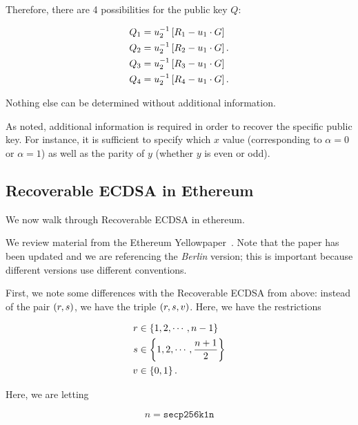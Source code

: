 \begin{itemize}
\noindent
Therefore, there are 4 possibilities for the public key $Q$:

\begin{align}
    Q_{1} &= u_{2}^{-1}\left[ R_{1} - u_{1}\cdot G \right]
        \nonumber\\
    Q_{2} &= u_{2}^{-1}\left[ R_{2} - u_{1}\cdot G \right].
        \nonumber\\
    Q_{3} &= u_{2}^{-1}\left[ R_{3} - u_{1}\cdot G \right]
        \nonumber\\
    Q_{4} &= u_{2}^{-1}\left[ R_{4} - u_{1}\cdot G \right].
\end{align}

\noindent
Nothing else can be determined without additional information.
\end{itemize}

As noted, additional information is required in order to recover
the specific public key.
For instance, it is sufficient to specify which $x$ value (corresponding
to $\alpha=0$ or $\alpha=1$)
as well as the parity of $y$ (whether $y$ is even or odd).


\subsection{Recoverable ECDSA in Ethereum}
\label{ssec:recoverable_ecdsa_ethereum}

We now walk through Recoverable ECDSA in \gls{ethereum}.

We review material from the
Ethereum Yellowpaper~\cite[Appendix F]{EthereumYellowpaper}.
Note that the paper has been updated and we are referencing
the \emph{Berlin} version;
this is important because different versions use different conventions.

First, we note some differences with the Recoverable ECDSA from above:
instead of the pair $\left( r,s \right)$, we have the triple $\left( r,s,v \right)$.
Here, we have the restrictions

\begin{align}
    r &\in \left\{ 1,2,\cdots, n-1 \right\} \nonumber\\
    s &\in \left\{ 1,2,\cdots, \frac{n+1}{2} \right\} \nonumber\\
    v &\in \left\{ 0,1 \right\}.
    \label{eq:ecc_recoverable_ecdsa}
\end{align}

\noindent
Here, we are letting

\begin{equation}
    n = \texttt{secp256k1n}
\end{equation}

